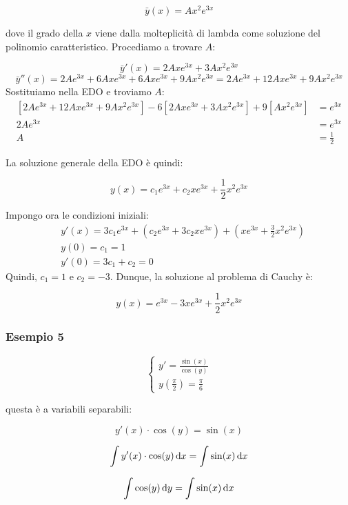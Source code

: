 \[
    \bar{y} (x) = Ax^{2}e^{3x}
\]

dove il grado della \(x\) viene dalla molteplicità di lambda come soluzione del polinomio caratteristico. Procediamo a trovare \(A\):

\[
    \bar{y}'(x) = 2Axe^{3x} + 3Ax^{2}e^{3x}
\]
\[
    \bar{y}''(x) = 2Ae^{3x} + 6Axe^{3x} + 6Axe^{3x} + 9Ax^2e^{3x} = 2Ae^{3x} + 12Axe^{3x} + 9Ax^2e^{3x}
\]
Sostituiamo nella EDO e troviamo \(A\):
\begin{align*}
    \left[ 2Ae^{3x} + 12Axe^{3x} + 9Ax^2e^{3x} \right] -6\left[ 2Axe^{3x} + 3Ax^{2}e^{3x} \right] + 9 \left[ Ax^{2}e^{3x} \right] & = e^{3x} \\
    2Ae^{3x} & = e^{3x} \\
    A & = \frac{1}{2}
\end{align*}

La soluzione generale della EDO è quindi:

\[
    y(x) = c_1 e ^{3x}+ c_2 x e ^{3x} + \frac{1}{2} x^{2}e ^{3x}
\]

Impongo ora le condizioni iniziali:
\begin{align*}
    & y'(x) = 3c_1 e ^{3x}+ \left( c_2 e ^{3x} + 3c_2 x e ^{3x} \right) + \left( xe ^{3x} + \frac{3}{2} x^{2}e ^{3x} \right) \\
    & y(0) = c_1 = 1 \\
    & y'(0) = 3c_1 + c_2 = 0
\end{align*}
Quindi, \(c_1 = 1\) e \(c_2 = -3\). Dunque, la soluzione al problema di Cauchy è:

\[
    y(x) = e^{3x} -3xe^{3x} +\frac{1}{2}x^{2}e^{3x}
\]

\filbreak{}
\subsubsection*{Esempio 5}

\begin{equation*}
    \begin{cases*}
        y'= \frac{\sin(x)}{\cos(y)} \\
        y\left( \frac{\pi}{2} \right) = \frac{\pi}{6}
    \end{cases*}
\end{equation*}

questa è a variabili separabili:

\[
    y'(x)\cdot\cos(y) = \sin(x)
\]

\[
    \int y'(x)\cdot\cos(y) \mathop{}\!\mathrm{d} x = \int \sin(x) \mathop{}\!\mathrm{d} x
\]

\[
    \int \cos(y) \mathop{}\!\mathrm{d} y = \int \sin(x) \mathop{}\!\mathrm{d} x
\]

